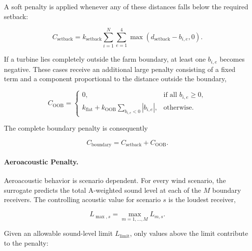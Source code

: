 \documentclass[11pt]{article}
\begin{document}
A soft penalty is applied whenever any of these distances falls below the required setback:

\begin{equation}
    C_{\mathrm{setback}}
    =
    k_{\mathrm{setback}}
    \sum_{i=1}^{N}
    \sum_{e=1}^{4}
    \max
    \left(
        d_{\mathrm{setback}}-b_{i,e},
        0
    \right).
    \label{eq:setback-penalty}
\end{equation}

If a turbine lies completely outside the farm boundary, at least one $b_{i,e}$ becomes negative. These cases receive an additional large penalty consisting of a fixed term and a component proportional to the distance outside the boundary,

\begin{equation}
    C_{\mathrm{OOB}}
    =
    \begin{cases}
        0,
        & \text{if all } b_{i,e} \geq 0, \\[6pt]
        k_{\mathrm{flat}}
        +
        k_{\mathrm{OOB}}
        \displaystyle
        \sum_{b_{i,e}<0}
        |b_{i,e}|,
        & \text{otherwise}.
    \end{cases}
    \label{eq:oob-penalty}
\end{equation}

The complete boundary penalty is consequently

\begin{equation}
    C_{\mathrm{boundary}}
    =
    C_{\mathrm{setback}}
    +
    C_{\mathrm{OOB}}.
    \label{eq:boundary-penalty}
\end{equation}


\paragraph{Aeroacoustic Penalty.}

Aeroacoustic behavior is scenario dependent. For every wind scenario, the surrogate predicts the total A-weighted sound level at each of the $M$ boundary receivers. The controlling acoustic value for scenario $s$ is the loudest receiver,

\begin{equation}
    L_{\max,s}
    =
    \max_{m=1,\ldots,M}
    L_{m,s}.
    \label{eq:scenario-max-noise}
\end{equation}

Given an allowable sound-level limit $L_{\mathrm{limit}}$, only values above the limit contribute to the penalty:
\end{document}
